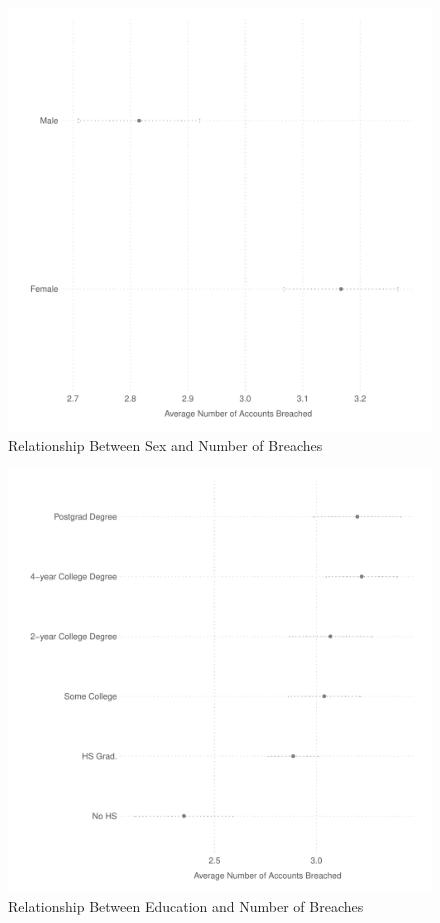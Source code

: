\documentclass[12pt, letterpaper]{article}
\begin{document}
\begin{figure}[H]
  \centering
   \caption{Relationship Between Sex and Number of Breaches  
  \label{fig:sex_breaches}}
    \includegraphics[scale=.75]{../figs/sex_pwned.pdf}
\end{figure}
\clearpage


\begin{figure}[H]
  \centering
   \caption{Relationship Between Education and Number of Breaches 
  \label{fig:educ_breaches}}
    \includegraphics[scale=.75]{../figs/educ_pwned.pdf}
\end{figure}
\clearpage
\end{document}
